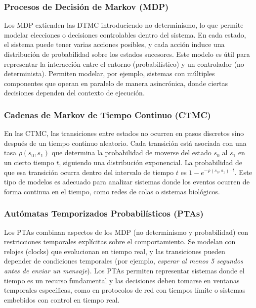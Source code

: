 \documentclass{article}
\begin{document}
\subsubsection{Procesos de Decisión de Markov (MDP)}

Los MDP extienden las DTMC introduciendo no determinismo, lo que permite modelar elecciones o decisiones controlables dentro del sistema. En cada estado, el sistema puede tener varias acciones posibles, y cada acción induce una distribución de probabilidad sobre los estados sucesores. Este modelo es útil para representar la interacción entre el entorno (probabilístico) y un controlador (no determinista). Permiten modelar, por ejemplo, sistemas con múltiples componentes que operan en paralelo de manera asincrónica, donde ciertas decisiones dependen del contexto de ejecución.

\subsubsection{Cadenas de Markov de Tiempo Continuo (CTMC)}

En las CTMC, las transiciones entre estados no ocurren en pasos discretos sino después de un tiempo continuo aleatorio. Cada transición está asociada con una tasa $\rho(s_0, s_1)$ que determina la probabilidad de moverse del estado $s_0$ al $s_1$ en un cierto tiempo $t$, siguiendo una distribución exponencial. La probabilidad de que esa transición ocurra dentro del intervalo de tiempo $t$ es $1 - e^{-\rho(s_0,s_1)\cdot t}$. Este tipo de modelos es adecuado para analizar sistemas donde los eventos ocurren de forma continua en el tiempo, como redes de colas o sistemas biológicos.

\subsubsection{Autómatas Temporizados Probabilísticos (PTAs)}

Los PTAs combinan aspectos de los MDP (no determinismo y probabilidad) con restricciones temporales explícitas sobre el comportamiento. Se modelan con relojes (clocks) que evolucionan en tiempo real, y las transiciones pueden depender de condiciones temporales (por ejemplo, \textit{esperar al menos 5 segundos antes de enviar un mensaje}). Los PTAs permiten representar sistemas donde el tiempo es un recurso fundamental y las decisiones deben tomarse en ventanas temporales específicas, como en protocolos de red con tiempos límite o sistemas embebidos con control en tiempo real.
\end{document}
